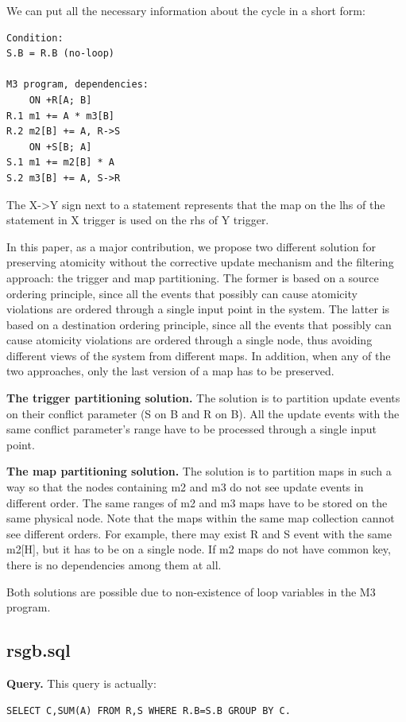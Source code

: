 \documentclass{sig-semester}
\begin{document}
We can put all the necessary information about the cycle in a short form:
\begin{verbatim}
Condition: 
S.B = R.B (no-loop)

M3 program, dependencies:
    ON +R[A; B] 
R.1 m1 += A * m3[B]
R.2 m2[B] += A, R->S
    ON +S[B; A] 
S.1 m1 += m2[B] * A
S.2 m3[B] += A, S->R
\end{verbatim}
The X->Y sign next to a statement represents that the map on the lhs of the statement in X trigger is used on the rhs of Y trigger.

In this paper, as a major contribution, we propose two different solution for preserving atomicity without the corrective update mechanism and the filtering approach: the trigger and map partitioning. The former is based on a source ordering principle, since all the events that possibly can cause atomicity violations are ordered through a single input point in the system. The latter is based on a destination ordering principle, since all the events that possibly can cause atomicity violations are ordered through a single node, thus avoiding different views of the system from different maps. In addition, when any of the two approaches, only the last version of a map has to be preserved.

\textbf{The trigger partitioning solution.} The solution is to partition update events on their conflict parameter (S on B and R on B). All the update events with the same conflict parameter's range have to be processed through a single input point.

\textbf{The map partitioning solution.} The solution is to partition maps in such a way so that the nodes containing m2 and m3 do not see update events in different order. The same ranges of m2 and m3 maps have to be stored on the same physical node. Note that the maps within the same map collection cannot see different orders. For example, there may exist R and S event with the same m2[H], but it has to be on a single node. If m2 maps do not have common key, there is no dependencies among them at all.

Both solutions are possible due to non-existence of loop variables in the M3 program.

\subsection{rsgb.sql}
\textbf{Query.} This query is actually:
\begin{verbatim}
SELECT C,SUM(A) FROM R,S WHERE R.B=S.B GROUP BY C.
\end{verbatim}
\end{document}
